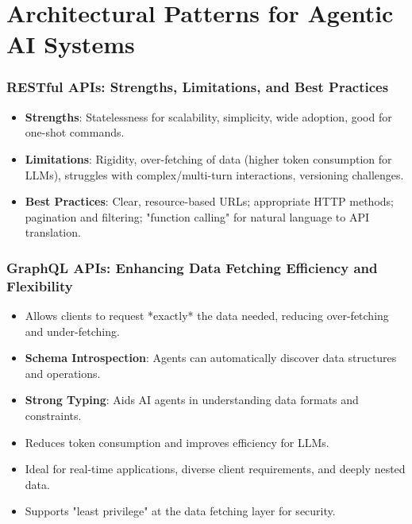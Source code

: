 \documentclass{beamer}       %
\begin{document}
\section{Architectural Patterns for Agentic AI Systems}

\begin{frame}
    \frametitle{RESTful APIs: Strengths, Limitations, and Best Practices}
    \begin{itemize}
        \item \textbf{Strengths}: Statelessness for scalability, simplicity, wide adoption, good for one-shot commands.
        \item \textbf{Limitations}: Rigidity, over-fetching of data (higher token consumption for LLMs), struggles with complex/multi-turn interactions, versioning challenges.
        \item \textbf{Best Practices}: Clear, resource-based URLs; appropriate HTTP methods; pagination and filtering; "function calling" for natural language to API translation.
    \end{itemize}
\end{frame}

\begin{frame}
    \frametitle{GraphQL APIs: Enhancing Data Fetching Efficiency and Flexibility}
    \begin{itemize}
        \item Allows clients to request *exactly* the data needed, reducing over-fetching and under-fetching.
        \item \textbf{Schema Introspection}: Agents can automatically discover data structures and operations.
        \item \textbf{Strong Typing}: Aids AI agents in understanding data formats and constraints.
        \item Reduces token consumption and improves efficiency for LLMs.
        \item Ideal for real-time applications, diverse client requirements, and deeply nested data.
        \item Supports "least privilege" at the data fetching layer for security.
    \end{itemize}
\end{frame}
\end{document}
